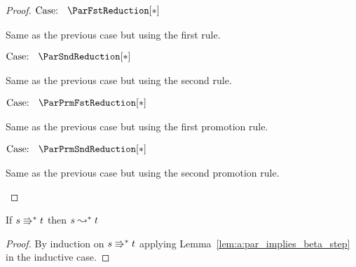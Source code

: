 \begin{proof}
    $\text{Case: }\begin{array}{c} \ParFstReduction[*] \end{array}$
    \begin{proofcase}
        Same as the previous case but using the first rule.
    \end{proofcase}

    $\text{Case: }\begin{array}{c} \ParSndReduction[*] \end{array}$
    \begin{proofcase}
        Same as the previous case but using the second rule.
    \end{proofcase}

    $\text{Case: }\begin{array}{c} \ParPrmFstReduction[*] \end{array}$
    \begin{proofcase}
        Same as the previous case but using the first promotion rule.
    \end{proofcase}

    $\text{Case: }\begin{array}{c} \ParPrmSndReduction[*] \end{array}$
    \begin{proofcase}
        Same as the previous case but using the second promotion rule.
    \end{proofcase}
\end{proof}

\begin{lemma}
    If $s \Rrightarrow^* t$ then $s \leadsto^* t$
    \label{lem:a:par_implies_beta}
\end{lemma}
\begin{proof}
    By induction on $s \Rrightarrow^* t$ applying Lemma~\ref{lem:a:par_implies_beta_step} in the inductive case.
\end{proof}

